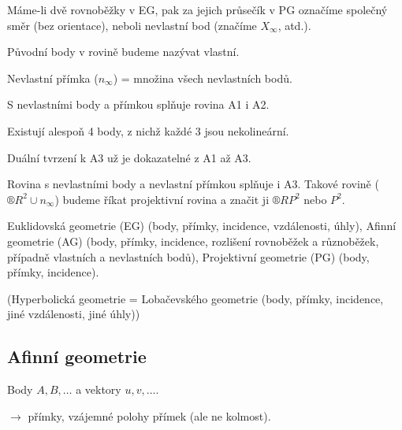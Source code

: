 \documentclass[12pt]{article}					%
\begin{document}
\begin{definice}
	Máme-li dvě rovnoběžky v EG, pak za jejich průsečík v PG označíme společný směr (bez orientace), neboli nevlastní bod (značíme $X_∞$, atd.).

	Původní body v rovině budeme nazývat vlastní.
\end{definice}

\begin{definice}
	Nevlastní přímka ($n_∞$) = množina všech nevlastních bodů.
\end{definice}

\begin{poznamka}
	S nevlastními body a přímkou splňuje rovina A1 i A2.
\end{poznamka}

\begin{definice}[Axiom A3]
	Existují alespoň 4 body, z nichž každé 3 jsou nekolineární.
\end{definice}

\begin{poznamka}[„A4“]
	Duální tvrzení k A3 už je dokazatelné z A1 až A3.
\end{poznamka}

\begin{definice}
	Rovina s nevlastními body a nevlastní přímkou splňuje i A3. Takové rovině ($®R^2 \cup n_∞$) budeme říkat projektivní rovina a značit ji $®RP^2$ nebo $P^2$.
\end{definice}

\begin{poznamka}
	Euklidovská geometrie (EG) (body, přímky, incidence, vzdálenosti, úhly), Afinní geometrie (AG) (body, přímky, incidence, rozlišení rovnoběžek a různoběžek, případně vlastních a nevlastních bodů), Projektivní geometrie (PG) (body, přímky, incidence).

	(Hyperbolická geometrie = Lobačevského geometrie (body, přímky, incidence, jiné vzdálenosti, jiné úhly))
\end{poznamka}

\subsection{Afinní geometrie}
\begin{poznamka}
	Body $A, B, …$ a vektory $u, v, …$.

	$\rightarrow$ přímky, vzájemné polohy přímek (ale ne kolmost).
\end{poznamka}
\end{document}

